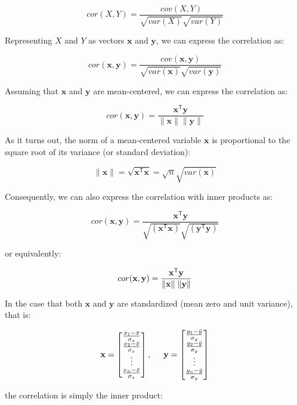 \documentclass[]{book}
\begin{document}
\[
cor(X, Y) = \frac{cov(X, Y)}{\sqrt{var(X)} \sqrt{var(Y)}}
\]

Representing \(X\) and \(Y\) as vectors \(\mathbf{x}\) and \(\mathbf{y}\), we can express the correlation as:

\[
cor(\mathbf{x}, \mathbf{y}) = \frac{cov(\mathbf{x}, \mathbf{y})}{\sqrt{var(\mathbf{x})} \sqrt{var(\mathbf{y})}}
\]

Assuming that \(\mathbf{x}\) and \(\mathbf{y}\) are mean-centered, we can express the correlation as:

\[
cor(\mathbf{x, y}) = \frac{\mathbf{x^{\mathsf{T}} y}}{\|\mathbf{x}\| \|\mathbf{y}\|}
\]

As it turns out, the norm of a mean-centered variable \(\mathbf{x}\) is
proportional to the square root of its variance (or standard deviation):

\[
\| \mathbf{x} \| = \sqrt{\mathbf{x^{\mathsf{T}} x}} 
 = \sqrt{n} \sqrt{var(\mathbf{x})}
\]

Consequently, we can also express the correlation with inner products as:

\[
cor(\mathbf{x, y}) = \frac{\mathbf{x^{\mathsf{T}} y}}{\sqrt{(\mathbf{x^{\mathsf{T}} x})} \sqrt{(\mathbf{y^{\mathsf{T}} y})}}
\]

or equivalently:

\[
cor(\mathbf{x, y}) = \frac{\mathbf{x^{\mathsf{T}} y}}{\| \mathbf{x} \| \hspace{1mm} \| \mathbf{y} \|}
\]

In the case that both \(\mathbf{x}\) and \(\mathbf{y}\) are standardized (mean zero
and unit variance), that is:

\[
\mathbf{x} = \begin{bmatrix}
\frac{x_1 - \bar{x}}{\sigma_{x}} \\
\frac{x_2 - \bar{x}}{\sigma_{x}} \\
\vdots \\
\frac{x_n - \bar{x}}{\sigma_{x}}
\end{bmatrix},
\hspace{5mm}
\mathbf{y} = \begin{bmatrix}
\frac{y_1 - \bar{y}}{\sigma_{y}} \\
\frac{y_2 - \bar{y}}{\sigma_{y}} \\
\vdots \\
\frac{y_n - \bar{y}}{\sigma_{y}}
\end{bmatrix}
\]

the correlation is simply the inner product:
\end{document}
